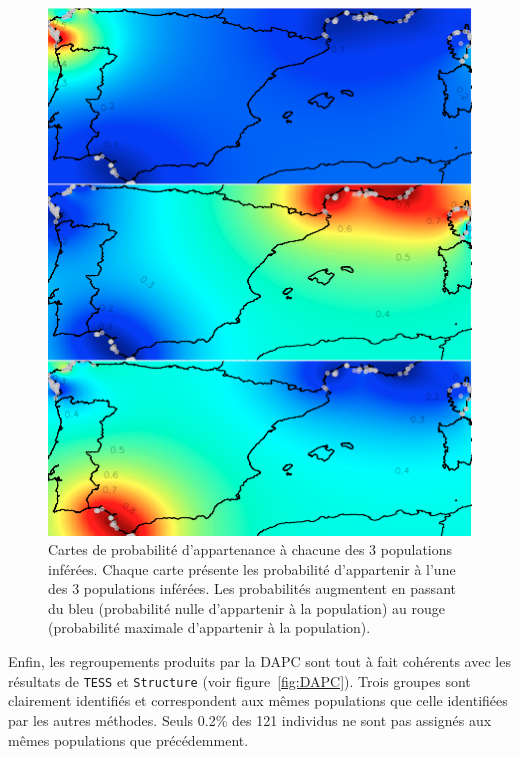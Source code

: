 \documentclass[a4paper,12pt,twoside]{article}\usepackage[]{graphicx}\usepackage[]{color}
\begin{document}
\begin {bibunit} [newbst]
\begin{figure}[htbp]
	\centering
		\includegraphics[width=.9\textwidth]{map_clusters_3}
	\caption[Cartes de probabilité d'appartenance aux populations inférées.]{Cartes de probabilité d'appartenance à chacune des 3 populations inférées. Chaque carte présente les probabilité d'appartenir à l'une des 3 populations inférées. Les probabilités augmentent en passant du bleu (probabilité nulle d'appartenir à la population) au rouge (probabilité maximale d'appartenir à la population).}
	\label{fig:probamap}
\end{figure}

Enfin, les regroupements produits par la DAPC sont tout à fait cohérents avec les résultats de \texttt{TESS} et \texttt{Structure} (voir figure~\ref{fig:DAPC}). Trois groupes sont clairement identifiés et correspondent aux mêmes populations que celle identifiées par les autres méthodes. Seuls 0.2\% des 121 individus ne sont pas assignés aux mêmes populations que précédemment.


\end{bibunit}
\end{document}
